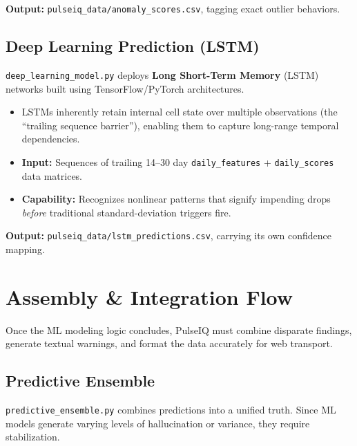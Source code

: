 \documentclass[12pt, a4paper, oneside]{report}
\begin{document}
\textbf{Output:} \texttt{pulseiq\_data/anomaly\_scores.csv}, tagging exact outlier behaviors.

\section{Deep Learning Prediction (LSTM)}
\label{sec:lstm}

\texttt{deep\_learning\_model.py} deploys \textbf{Long Short-Term Memory} (LSTM) networks built using TensorFlow/PyTorch architectures.

\begin{itemize}
    \item LSTMs inherently retain internal cell state over multiple observations (the ``trailing sequence barrier''), enabling them to capture long-range temporal dependencies.

    \item \textbf{Input:} Sequences of trailing 14--30 day \texttt{daily\_features} + \texttt{daily\_scores} data matrices.

    \item \textbf{Capability:} Recognizes nonlinear patterns that signify impending drops \emph{before} traditional standard-deviation triggers fire.
\end{itemize}

\textbf{Output:} \texttt{pulseiq\_data/lstm\_predictions.csv}, carrying its own confidence mapping.


\chapter{Assembly \& Integration Flow}
\label{ch:assembly}

Once the ML modeling logic concludes, PulseIQ must combine disparate findings, generate textual warnings, and format the data accurately for web transport.

\section{Predictive Ensemble}
\label{sec:ensemble}

\texttt{predictive\_ensemble.py} combines predictions into a unified truth. Since ML models generate varying levels of hallucination or variance, they require stabilization.
\end{document}
